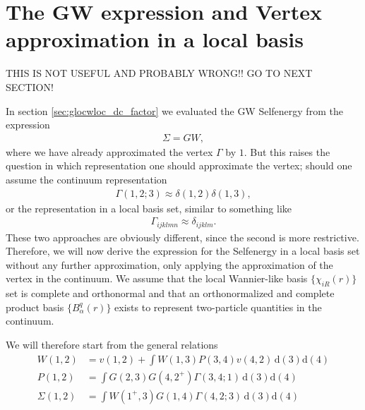 \documentclass[12pt,a4paper]{scrartcl}
\numberwithin{equation}{section}
\newcommand{\cng}[1]{{\color{red}#1}}
\begin{document}


\clearpage 

\section{The GW expression and Vertex approximation in a local basis}
\cng{THIS IS NOT USEFUL AND PROBABLY WRONG!! GO TO NEXT SECTION!}

In section \ref{sec:glocwloc_dc_factor} we evaluated the GW Selfenergy
from the expression 
\begin{align}
 \Sigma = GW,
\end{align}
where we have already approximated the vertex $\Gamma$ by $1$.
But this raises the question in which representation one should approximate
the vertex; should one assume the continuum representation
\begin{align}
 \Gamma(1,2;3) \approx  \delta(1,2)\delta(1,3),
\end{align}
or the representation in a local basis set, similar to something like
\begin{align}
 \Gamma_{ijklmn} \approx  \delta_{ijklm} .
\end{align}
These two approaches are obviously different, since the second is more restrictive.
Therefore, we will now derive the expression for the Selfenergy
in a local basis set without any further approximation, only
applying the approximation of the vertex in the continuum.
We assume that the local Wannier-like basis $\{ \chi_{iR}(r) \}$ set is complete 
and orthonormal 
and that an orthonormalized and complete product basis $\{ B^q_\alpha(r) \}$
exists to represent two-particle quantities in the continuum.

We will therefore start from the general relations
\begin{align}
W(1,2)
 &= v(1,2)
  + \int  W(1,3) P(3,4) v(4,2) \, \mathrm{d}(3)\mathrm{d}(4) \label{eq:w_continuum} \\
%
P(1,2) &= \int G(2,3)G(4,2^+) \Gamma(3,4;1) \, \mathrm{d}(3)\mathrm{d}(4) \\
%
\Sigma(1,2)
&= \int W(1^+,3) G(1,4) \Gamma(4,2;3) \, \mathrm{d}(3)\mathrm{d}(4)
\end{align}
\end{document}

